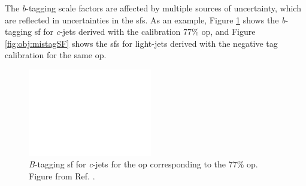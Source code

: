 The \textit{b}-tagging scale factors are affected by multiple sources of uncertainty, which are reflected in uncertainties in the \glspl{sf}.
As an example, Figure \ref{fig:obj:btagSF} shows the \textit{b}-tagging \gls{sf} for \textit{c}-jets derived with the \ttbar calibration 77\% \gls{op}, 
and Figure \ref{fig:obj:mistagSF} shows the \glspl{sf} for light-jets derived with the negative tag calibration for the same \gls{op}.


\begin{figure}[htbp]
\begin{center}
    \includegraphics[width=0.48\textwidth]{figures/Chap5/Rizzi-Fig5-7-1.pdf}  %
\end{center}
 \caption{\textit{B}-tagging \gls{sf} for \textit{c}-jets for the \gls{op} corresponding to the 77\% \gls{op}. Figure from Ref. \cite{ATLAS-CONF-2018-001}.}
  \label{fig:obj:btagSF}
\end{figure}

